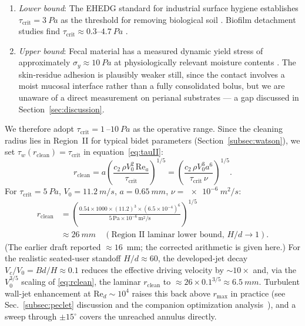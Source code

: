 \documentclass[aps,prfluids,reprint,amsmath,amssymb,floatfix]{revtex4-2}
\newcommand{\Rey}{\mathrm{Re}}
\begin{document}
\begin{enumerate}[leftmargin=*, label=(\roman*)]
    \item \emph{Lower bound}: The EHEDG standard for industrial surface
    hygiene establishes $\tau_\mathrm{crit} = \SI{3}{Pa}$ as the threshold
    for removing biological soil \citep{Ehedg2003}. Biofilm detachment
    studies find $\tau_\mathrm{crit} \approx 0.3$--$\SI{4.7}{Pa}$
    \citep{Teodosio2010}.
    \item \emph{Upper bound}: Fecal material has a measured dynamic yield
    stress of approximately $\sigma_y \approx \SI{10}{Pa}$ at physiologically
    relevant moisture contents \citep{Woolley2014}. The skin-residue
    adhesion is plausibly weaker still, since the contact involves a
    moist mucosal interface rather than a fully consolidated bolus, but
    we are unaware of a direct measurement on perianal substrates ---
    a gap discussed in Section~\ref{sec:discussion}.
\end{enumerate}

We therefore adopt $\tau_\mathrm{crit} = \SI{1}{}$--$\SI{10}{Pa}$ as
the operative range. Since the cleaning radius lies in Region~II for
typical bidet parameters (Section~\ref{subsec:watson}), we set
$\tau_w(r_\mathrm{clean}) = \tau_\mathrm{crit}$ in
equation~\eqref{eq:tauII}:
\begin{equation}
    r_\mathrm{clean} = a\left(\frac{c_2\,\rho V_0^2\,\Rey_a}{\tau_\mathrm{crit}}\right)^{1/5}
    = \left(\frac{c_2\,\rho V_0^3 a^6}{\tau_\mathrm{crit}\,\nu}\right)^{1/5}.
    \label{eq:rclean}
\end{equation}
For $\tau_\mathrm{crit} = \SI{5}{Pa}$, $V_0 = \SI{11.2}{m/s}$,
$a = \SI{0.65}{mm}$, $\nu = \SI{e-6}{m^2/s}$:
\begin{align}
    r_\mathrm{clean} &= \left(\frac{0.54 \times 1000 \times (11.2)^3
    \times (6.5\times 10^{-4})^6}{5\,\mathrm{Pa}\times 10^{-6}\,\mathrm{m^2/s}}\right)^{1/5}
    \nonumber\\
    &\approx \SI{26}{mm}\quad
    (\text{Region~II laminar lower bound, $H/d \to 1$}).
    \label{eq:rcleanval}
\end{align}
(The earlier draft reported $\approx 16$~mm; the corrected arithmetic
is given here.) For the realistic seated-user standoff $H/d \approx 60$,
the developed-jet decay $V_c/V_0 = B d/H \approx 0.1$ reduces the
effective driving velocity by $\sim 10\times$ and, via the
$V_0^{3/5}$ scaling of \eqref{eq:rclean}, the laminar
$r_\mathrm{clean}$ to $\approx 26 \times 0.1^{3/5} \approx \SI{6.5}{mm}$.
Turbulent wall-jet enhancement at $\Rey_d \sim 10^4$ raises this back
above $r_\mathrm{max}$ in practice (see Sec.~\ref{subsec:peclet}
discussion and the companion optimization
analysis~\citep{BurtonOptPaper}), and a sweep through $\pm 15^\circ$
covers the unreached annulus directly.
\end{document}
